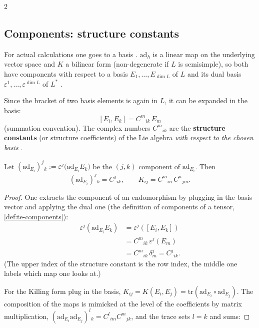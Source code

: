 \begin{paracol}{2}
\subsection{Components: structure constants}\label{sec:cl-components}
For actual calculations one goes to a basis  . $\mathrm{ad}_h$ is a linear map on the underlying vector space and $K$ a bilinear form (non-degenerate if $L$ is semisimple), so both have components with respect to a basis $E_1,\dots,E_{\dim L}$ of $L$ and its dual basis $\varepsilon^1,\dots,\varepsilon^{\dim L}$ of $L^*$    .
\begin{definition}\label{def:cl-structure}
Since the bracket of two basis elements is again in $L$, it can be expanded in the basis:
\[
  [E_i,E_k]=C^{m}{}_{ik}\,E_m
\]
(summation convention). The complex numbers $C^m{}_{ik}$ are the \textbf{structure constants} (or structure coefficients) of the Lie algebra \emph{with respect to the chosen basis}     .
\end{definition}
\begin{proposition}\label{prop:cl-components}
Let $(\mathrm{ad}_{E_i})^j{}_k:=\varepsilon^j\bigl(\mathrm{ad}_{E_i}E_k\bigr)$ be the $(j,k)$ component of $\mathrm{ad}_{E_i}$. Then
\[
  (\mathrm{ad}_{E_i})^j{}_k=C^j{}_{ik},\qquad K_{ij}=C^m{}_{in}\,C^n{}_{jm}.
\]
\end{proposition}
\begin{proof}
One extracts the component of an endomorphism by plugging in the basis vector and applying the dual one (the definition of components of a tensor, \cref{def:te-components}):
\[
  \begin{aligned}
  \varepsilon^j(\mathrm{ad}_{E_i}E_k)&=\varepsilon^j([E_i,E_k])\\
  &=C^m{}_{ik}\,\varepsilon^j(E_m)\\
  &=C^m{}_{ik}\,\delta^j_m=C^j{}_{ik}.
  \end{aligned}
\]
(The upper index of the structure constant is the row index, the middle one labels which map one looks at.)         \par
For the Killing form plug in the basis, $K_{ij}=K(E_i,E_j)=\mathrm{tr}(\mathrm{ad}_{E_i}\circ\mathrm{ad}_{E_j})$. The composition of the maps is mimicked at the level of the coefficients by matrix multiplication, $(\mathrm{ad}_{E_i}\mathrm{ad}_{E_j})^l{}_k=C^l{}_{im}C^m{}_{jk}$, and the trace sets $l=k$ and sums:

\end{proof}
\end{paracol}
